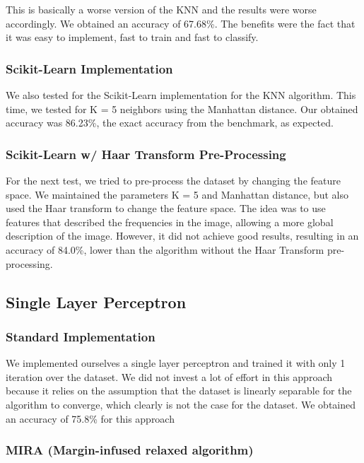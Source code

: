\documentclass{article}
\begin{document}
This is basically a worse version of the KNN and the results were worse accordingly.
We obtained an accuracy of 67.68\%.
The benefits were the fact that it was easy to implement, fast to train and fast to classify.

\subsubsection{Scikit-Learn Implementation}

We also tested for the Scikit-Learn implementation for the KNN algorithm.
This time, we tested for K = 5 neighbors using the Manhattan distance.
Our obtained accuracy was 86.23\%, the exact accuracy from the benchmark, as expected.

\subsubsection{Scikit-Learn w/ Haar Transform Pre-Processing}

For the next test, we tried to pre-process the dataset by changing the feature space. We  maintained the parameters K = 5 and
Manhattan distance, but also used the Haar transform to change the feature space. The idea was to use features that described the frequencies
in the image, allowing a more global description of the image. However, it did not achieve good results, resulting in an accuracy of 84.0\%, lower than
the algorithm without the Haar Transform pre-processing.

\subsection{Single Layer Perceptron}

\subsubsection{Standard Implementation}

We implemented ourselves a single layer perceptron and trained it with only 1 iteration over the dataset.
We did not invest a lot of effort in this approach because it relies on the assumption that the dataset
is linearly separable for the algorithm to converge, which clearly is not the case for the dataset.
We obtained an accuracy of 75.8\% for this approach

\subsubsection{MIRA (Margin-infused relaxed algorithm)}
\end{document}
